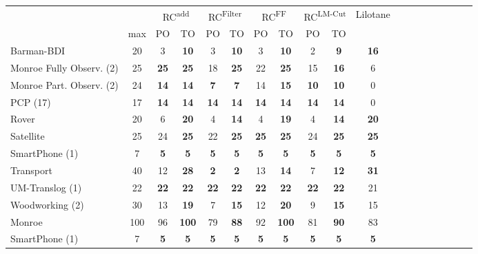 \begin{tabular}{lccccccccccccccccccl} 
\toprule 
  && \multicolumn{2}{c}{RC\textsuperscript{add}} & \multicolumn{2}{c}{RC\textsuperscript{Filter}} & \multicolumn{2}{c}{RC\textsuperscript{FF}} & \multicolumn{2}{c}{RC\textsuperscript{LM-Cut}} & \multicolumn{2}{c}{Lilotane} \\ 
\cmidrule(lr){3-4} \cmidrule(lr){5-6} \cmidrule(lr){7-8} \cmidrule(lr){9-10} \cmidrule(lr){11-12}  
 & max &PO & TO & PO & TO & PO & TO & PO &\multicolumn{2}{c}{ TO  } \\ 
\midrule 
Barman-BDI & 20 & 3 & \textbf{10} & 3 & \textbf{10} & 3 & \textbf{10} & 2 & \textbf{9} &\multicolumn{2}{c}{ \textbf{16}  } \\ 
 Monroe Fully Observ. (2) & 25 & \textbf{25} & \textbf{25} & 18 & \textbf{25} & 22 & \textbf{25} & 15 & \textbf{16} &\multicolumn{2}{c}{ 6  } \\ 
 Monroe Part. Observ. (2) & 24 & \textbf{14} & \textbf{14} & \textbf{7} & \textbf{7} & 14 & \textbf{15} & \textbf{10} & \textbf{10} &\multicolumn{2}{c}{ 0  } \\ 
PCP (17) & 17 & \textbf{14} & \textbf{14} & \textbf{14} & \textbf{14} & \textbf{14} & \textbf{14} & \textbf{14} & \textbf{14} &\multicolumn{2}{c}{ 0  } \\ 
Rover & 20 & 6 & \textbf{20} & 4 & \textbf{14} & 4 & \textbf{19} & 4 & \textbf{14} &\multicolumn{2}{c}{ \textbf{20}  } \\ 
Satellite & 25 & 24 & \textbf{25} & 22 & \textbf{25} & \textbf{25} & \textbf{25} & 24 & \textbf{25} &\multicolumn{2}{c}{ \textbf{25}  } \\ 
SmartPhone (1) & 7 & \textbf{5} & \textbf{5} & \textbf{5} & \textbf{5} & \textbf{5} & \textbf{5} & \textbf{5} & \textbf{5} &\multicolumn{2}{c}{ \textbf{5}  } \\ 
Transport & 40 & 12 & \textbf{28} & \textbf{2} & \textbf{2} & 13 & \textbf{14} & 7 & \textbf{12} &\multicolumn{2}{c}{ \textbf{31}  } \\ 
UM-Translog (1) & 22 & \textbf{22} & \textbf{22} & \textbf{22} & \textbf{22} & \textbf{22} & \textbf{22} & \textbf{22} & \textbf{22} &\multicolumn{2}{c}{ 21  } \\ 
Woodworking (2) & 30 & 13 & \textbf{19} & 7 & \textbf{15} & 12 & \textbf{20} & 9 & \textbf{15} &\multicolumn{2}{c}{ 15  } \\ 
\midrule 
 Monroe & 100 & 96 & \textbf{100} & 79 & \textbf{88} & 92 & \textbf{100} & 81 & \textbf{90} &\multicolumn{2}{c}{ 83  } \\ 
SmartPhone (1) & 7 & \textbf{5} & \textbf{5} & \textbf{5} & \textbf{5} & \textbf{5} & \textbf{5} & \textbf{5} & \textbf{5} &\multicolumn{2}{c}{ \textbf{5}  } \\ 

\end{tabular}
